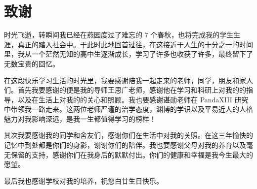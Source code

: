 
\chapter{致谢}

时光飞逝，转瞬间我已经在燕园度过了难忘的 7 个春秋，也将完成我的学生生涯，真正的踏入社会中。于此时此地回首过往，在这接近于人生的十分之一的时间里，我从一个茫然无知的高中生逐渐成长，学习了许多也收获了许多，最终留下了无数宝贵的回忆。

在这段快乐学习生活的时光里，我要感谢陪我一起走来的老师，同学，朋友和家人们。首先我要感谢的便是我的导师王思广老师，感谢他在学习和科研上对我的的指导，以及在生活上对我的的关心和照顾。我也要感谢谌勋老师在 PandaXIII 研究中带领我一路走来。这两位老师严谨的治学态度，渊博的学识以及平易近人的人格魅力对我影响深远，是我一生都值得学习的榜样！

其次我要感谢我的同学和舍友们，感谢你们在生活中对我的关照。在这三年愉快的记忆中到处都是你们的身影，谢谢你们的陪伴。我也要感谢父母对我的养育以及毫无保留的支持，感谢你们在我身后的默默付出。你们的健康和幸福是我今生最大的愿望。

最后我也感谢学校对我的培养，祝您白廿生日快乐。
